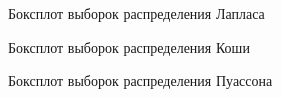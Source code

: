 \documentclass[12pt]{article}
\newcommand{\lskip}{\hfill\break}
\begin{document}
\begin{flushleft}
        \begin{figure}[h]
            \caption{Боксплот выборок распределения Лапласа}
        \end{figure}

        \newpage
        \lskip
        \lskip
        \lskip

        \begin{figure}[h]
            \caption{Боксплот выборок распределения Коши}
        \end{figure}

        \begin{figure}[h]
            \caption{Боксплот выборок распределения Пуассона}
        \end{figure}


\end{flushleft}
\end{document}
